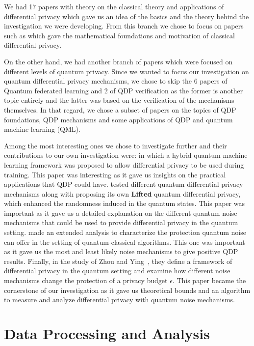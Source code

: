 \documentclass{ieeeaccess}
\begin{document}
We had 17 papers with theory on the classical theory and applications of differential privacy which gave us an idea of the basics and the theory behind the investigation we were developing. From this branch we chose to focus on papers such as \cite{dwork2014algorithmic} which gave the mathematical foundations and motivation of classical differential privacy.

On the other hand, we had another branch of papers which were focused on different levels of quantum privacy. Since we wanted to focus our investigation on quantum differential privacy mechanisms, we chose to skip the 6 papers of Quantum federated learning and 2 of QDP verification as the former is another topic entirely and the latter was based on the verification of the mechanisms themselves. In that regard, we chose a subset of papers on the topics of QDP foundations, QDP mechanisms and some applications of QDP and quantum machine learning (QML).

Among the most interesting ones we chose to investigate further and their contributions to our own investigation were: \cite{watkins2023quantum} in which a hybrid quantum machine learning framework was proposed to allow differential privacy to be used during training. This paper was interesting as it gave us insights on the practical applications that QDP could have. \cite{song2025hybrid} tested different quantum differential privacy mechanisms along with proposing its own \textbf{Lifted} quantum differential privacy, which enhanced the randomness induced in the quantum states. This paper was important as it gave us a detailed explanation on the different quantum noise mechanisms that could be used to provide differential privacy in the quantum setting. \cite{yang2023improved} made an extended analysis to characterize the protection quantum noise can offer in the setting of quantum-classical algorithms. This one was important as it gave us the most and least likely noise mechanisms to give positive QDP results. Finally, in the study of Zhou and Ying~\cite{zhou2017differential}, they define a framework of differential privacy in the quantum setting and examine how different noise mechanisms change the protection of a privacy budget $\epsilon$. This paper became the cornerstone of our investigation as it gave us theoretical bounds and an algorithm to measure and analyze differential privacy with quantum noise mechanisms.

\section{Data Processing and Analysis}
\label{sec:data_processing_and_analysis}
\end{document}
